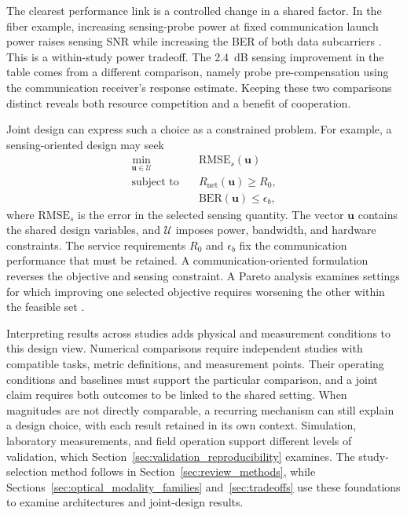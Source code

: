 The clearest performance link is a controlled change in a shared factor.
In the fiber example, increasing sensing-probe power at fixed communication
launch power raises sensing SNR while increasing the BER of both data
subcarriers \cite{OISAC_SCR00057}. This is a within-study power tradeoff.
The 2.4~dB sensing improvement in the table comes from a different comparison,
namely probe pre-compensation using the communication receiver's response
estimate. Keeping these two comparisons distinct reveals both resource
competition and a benefit of cooperation.

Joint design can express such a choice as a constrained problem. For example,
a sensing-oriented design may seek
\begin{equation}
\begin{aligned}
\min_{\boldsymbol{u}\in\mathcal{U}}\quad&
\mathrm{RMSE}_{s}(\boldsymbol{u})\\
\text{subject to}\quad&
R_{\mathrm{net}}(\boldsymbol{u})\geq R_0,\\
&\mathrm{BER}(\boldsymbol{u})\leq\epsilon_b ,
\end{aligned}
\label{eq:joint_design_service_floor}
\end{equation}
where $\mathrm{RMSE}_{s}$ is the error in the selected sensing quantity.
The vector $\boldsymbol{u}$ contains the shared design variables, and
$\mathcal{U}$ imposes power, bandwidth, and hardware constraints.
The service requirements $R_0$ and $\epsilon_b$ fix the communication
performance that must be retained. A communication-oriented formulation
reverses the objective and sensing constraint. A Pareto analysis examines
settings for which improving one selected objective requires worsening the
other within the feasible set
\cite{Wen2024OISACArchitectures,Lyu2026PhotonicTHzWaveforms}.

Interpreting results across studies adds physical and measurement conditions
to this design view. Numerical comparisons require independent studies with
compatible tasks, metric definitions, and measurement points. Their operating
conditions and baselines must support the particular comparison, and a joint
claim requires both outcomes to be linked to the shared setting.
When magnitudes are not directly comparable, a recurring mechanism can still
explain a design choice, with each result retained in its own context.
Simulation, laboratory measurements, and field operation support different
levels of validation, which Section~\ref{sec:validation_reproducibility}
examines. The study-selection method follows in
Section~\ref{sec:review_methods}, while
Sections~\ref{sec:optical_modality_families} and~\ref{sec:tradeoffs}
use these foundations to examine architectures and joint-design results.

\FloatBarrier
